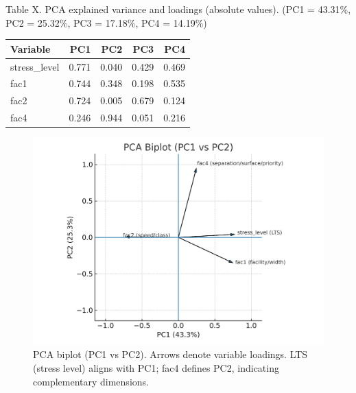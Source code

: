 \documentclass[
  12pt,
  oneside]{book}
\begin{document}
Table X. PCA explained variance and loadings (absolute values).
(PC1 = 43.31\%, PC2 = 25.32\%, PC3 = 17.18\%, PC4 = 14.19\%)

\begin{table}
\centering
\begin{tabular}{lrrrr}
\toprule
\textbf{Variable} & \textbf{PC1} & \textbf{PC2} & \textbf{PC3} & \textbf{PC4}\\
\midrule
stress\_level & 0.771 & 0.040 & 0.429 & 0.469\\
fac1 & 0.744 & 0.348 & 0.198 & 0.535\\
fac2 & 0.724 & 0.005 & 0.679 & 0.124\\
fac4 & 0.246 & 0.944 & 0.051 & 0.216\\
\bottomrule
\end{tabular}
\end{table}

\begin{figure}

{\centering \includegraphics[width=0.9\linewidth]{general_images/pca} 

}

\caption{PCA biplot (PC1 vs PC2). Arrows denote variable loadings. LTS (stress level) aligns with PC1; fac4 defines PC2, indicating complementary dimensions.}\label{fig:pca}
\end{figure}
\end{document}
